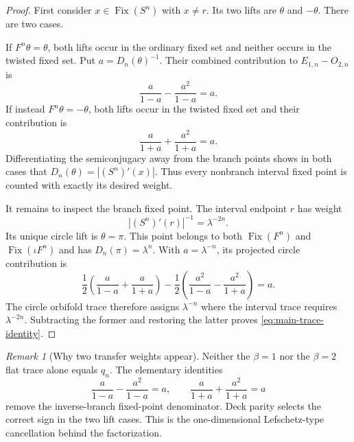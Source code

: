 \documentclass[11pt]{article}
\theoremstyle{definition}
\theoremstyle{remark}
\newtheorem{remark}[theorem]{Remark}
\newcommand{\Fix}{\operatorname{Fix}}
\begin{document}
\begin{proof}
First consider $x\in\Fix(S^n)$ with $x\ne r$.  Its two lifts are
$\theta$ and $-\theta$.  There are two cases.

If $F^n\theta=\theta$, both lifts occur in the ordinary fixed set and neither
occurs in the twisted fixed set.  Put $a=D_n(\theta)^{-1}$.  Their combined
contribution to $E_{1,n}-O_{2,n}$ is
\begin{equation}\label{eq:untwisted-pair}
 \frac{a}{1-a}-\frac{a^2}{1-a}=a.
\end{equation}
If instead $F^n\theta=-\theta$, both lifts occur in the twisted fixed set and
their contribution is
\begin{equation}\label{eq:twisted-pair}
 \frac{a}{1+a}+\frac{a^2}{1+a}=a.
\end{equation}
Differentiating the semiconjugacy away from the branch points shows in both
cases that $D_n(\theta)=|(S^n)'(x)|$.  Thus every nonbranch interval fixed
point is counted with exactly its desired weight.

It remains to inspect the branch fixed point.  The interval endpoint $r$ has
weight
\begin{equation}\label{eq:interval-branch-weight}
 |(S^n)'(r)|^{-1}=\lambda^{-2n}.
\end{equation}
Its unique circle lift is $\theta=\pi$.  This point belongs to both
$\Fix(F^n)$ and $\Fix(\iota F^n)$ and has $D_n(\pi)=\lambda^n$.  With
$a=\lambda^{-n}$, its projected circle contribution is
\begin{equation}\label{eq:orbifold-branch-weight}
 \frac12\left(\frac a{1-a}+\frac a{1+a}\right)
 -\frac12\left(\frac {a^2}{1-a}-\frac {a^2}{1+a}\right)
 =a.
\end{equation}
The circle orbifold trace therefore assigns $\lambda^{-n}$ where the interval
trace requires $\lambda^{-2n}$.  Subtracting the former and restoring the
latter proves \eqref{eq:main-trace-identity}.
\end{proof}

\begin{remark}[Why two transfer weights appear]
\label{rem:two-weights}
Neither the $\beta=1$ nor the $\beta=2$ flat trace alone equals $q_n$.  The
elementary identities
\begin{equation}\label{eq:denominator-cancellation}
 \frac{a}{1-a}-\frac{a^2}{1-a}=a,
 \qquad
 \frac{a}{1+a}+\frac{a^2}{1+a}=a
\end{equation}
remove the inverse-branch fixed-point denominator.  Deck parity selects the
correct sign in the two lift cases.  This is the one-dimensional
Lefschetz-type cancellation behind the factorization.
\end{remark}
\end{document}
